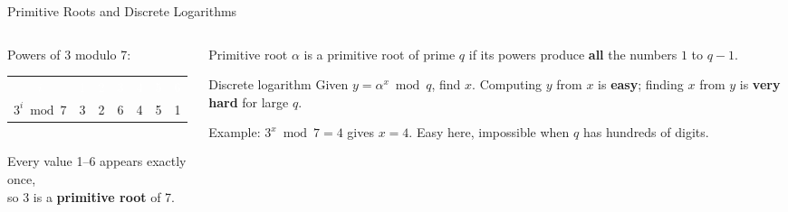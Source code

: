 \documentclass[aspectratio=169,11pt,xcolor={table}]{beamer}
\begin{document}
\begin{frame}{Primitive Roots and Discrete Logarithms}
  \begin{columns}[c]
    \begin{column}{0.48\textwidth}
      \centering
      {\small Powers of 3 modulo 7:}\\[2mm]
      \renewcommand{\arraystretch}{1.3}
      \begin{tabular}{c|cccccc}
        \rowcolor{navy}\textcolor{white}{$i$} & \textcolor{white}{1} & \textcolor{white}{2} & \textcolor{white}{3} & \textcolor{white}{4} & \textcolor{white}{5} & \textcolor{white}{6}\\
        $3^{i} \bmod 7$ & 3 & 2 & 6 & 4 & 5 & 1\\
      \end{tabular}\\[3mm]
      {\small Every value 1--6 appears exactly once,\\so 3 is a \textbf{primitive root} of 7.}
    \end{column}
    \begin{column}{0.5\textwidth}
      \begin{block}{Primitive root}
        \small $\alpha$ is a primitive root of prime $q$ if its powers produce \textbf{all} the numbers $1$ to $q-1$.
      \end{block}
      \begin{alertblock}{Discrete logarithm}
        \small Given $y = \alpha^{x} \bmod q$, find $x$. Computing $y$ from $x$ is \textbf{easy}; finding $x$ from $y$ is \textbf{very hard} for large $q$.
      \end{alertblock}
      {\small Example: $3^{x} \bmod 7 = 4$ gives $x = 4$. Easy here, impossible when $q$ has hundreds of digits.}
    \end{column}
  \end{columns}
\end{frame}
\end{document}
